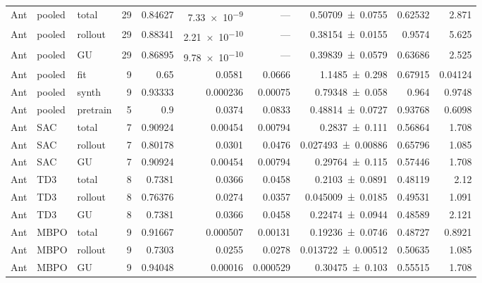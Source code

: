 {\begin{longtable}{@{}lllrrrrrrr@{}}
    \midrule
    Ant & pooled & total & \num{29} & \num{0.84627} & \num{7.33e-9} & --- & \num{0.50709+-0.0755} & \num{0.62532} & \num{2.871} \\
    Ant & pooled & rollout & \num{29} & \num{0.88341} & \num{2.21e-10} & --- & \num{0.38154+-0.0155} & \num{0.9574} & \num{5.625} \\
    Ant & pooled & GU & \num{29} & \num{0.86895} & \num{9.78e-10} & --- & \num{0.39839+-0.0579} & \num{0.63686} & \num{2.525} \\
    Ant & pooled & fit & \num{9} & \num{0.65} & \num{0.0581} & \num{0.0666} & \num{1.1485+-0.298} & \num{0.67915} & \num{0.04124} \\
    Ant & pooled & synth & \num{9} & \num{0.93333} & \num{0.000236} & \num{0.00075} & \num{0.79348+-0.058} & \num{0.964} & \num{0.9748} \\
    Ant & pooled & pretrain & \num{5} & \num{0.9} & \num{0.0374} & \num{0.0833} & \num{0.48814+-0.0727} & \num{0.93768} & \num{0.6098} \\
    \midrule
    Ant & SAC & total & \num{7} & \num{0.90924} & \num{0.00454} & \num{0.00794} & \num{0.2837+-0.111} & \num{0.56864} & \num{1.708} \\
    Ant & SAC & rollout & \num{7} & \num{0.80178} & \num{0.0301} & \num{0.0476} & \num{0.027493+-0.00886} & \num{0.65796} & \num{1.085} \\
    Ant & SAC & GU & \num{7} & \num{0.90924} & \num{0.00454} & \num{0.00794} & \num{0.29764+-0.115} & \num{0.57446} & \num{1.708} \\
    Ant & TD3 & total & \num{8} & \num{0.7381} & \num{0.0366} & \num{0.0458} & \num{0.2103+-0.0891} & \num{0.48119} & \num{2.12} \\
    Ant & TD3 & rollout & \num{8} & \num{0.76376} & \num{0.0274} & \num{0.0357} & \num{0.045009+-0.0185} & \num{0.49531} & \num{1.091} \\
    Ant & TD3 & GU & \num{8} & \num{0.7381} & \num{0.0366} & \num{0.0458} & \num{0.22474+-0.0944} & \num{0.48589} & \num{2.121} \\
    Ant & MBPO & total & \num{9} & \num{0.91667} & \num{0.000507} & \num{0.00131} & \num{0.19236+-0.0746} & \num{0.48727} & \num{0.8921} \\
    Ant & MBPO & rollout & \num{9} & \num{0.7303} & \num{0.0255} & \num{0.0278} & \num{0.013722+-0.00512} & \num{0.50635} & \num{1.085} \\
    Ant & MBPO & GU & \num{9} & \num{0.94048} & \num{0.00016} & \num{0.000529} & \num{0.30475+-0.103} & \num{0.55515} & \num{1.708} \\

\end{longtable}}
